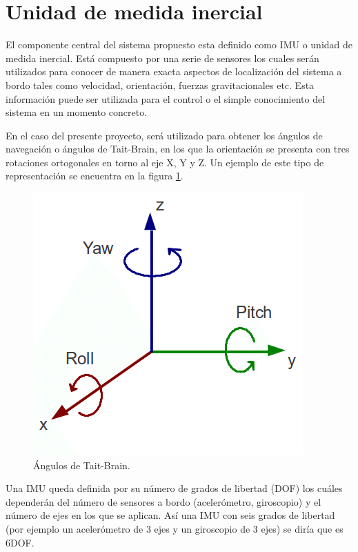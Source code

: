 \section{Unidad de medida inercial}\label{sec:IMU}
El componente central del sistema propuesto esta definido como IMU o unidad de medida inercial. Está compuesto por una serie de sensores los cuales serán utilizados para conocer de manera exacta aspectos de localización del sistema a bordo tales como velocidad, orientación, fuerzas gravitacionales etc. \newline
Esta información puede ser utilizada para el control o el simple conocimiento del sistema en un momento concreto. \newline

En el caso del presente proyecto, será utilizado para obtener los ángulos de navegación o ángulos de Tait-Brain, en los que la orientación se presenta con tres rotaciones ortogonales en torno al eje X, Y y Z. Un ejemplo de este tipo de representación se encuentra en la figura \ref{fig:orientacion}.\newline


\begin{figure}[H]
	\center
	\includegraphics[scale=0.5]{imagenes/Balancing_robot/orientacion}
	\caption{Ángulos de Tait-Brain.}
	\label{fig:orientacion}
\end{figure}


Una IMU queda definida por su número de grados de libertad (DOF) los cuáles dependerán del número de sensores a bordo (acelerómetro, giroscopio) y el número de ejes en los que se aplican. Así una IMU con seis grados de libertad (por ejemplo un acelerómetro de 3 ejes y un giroscopio de 3 ejes) se diría que es 6DOF. \newline

